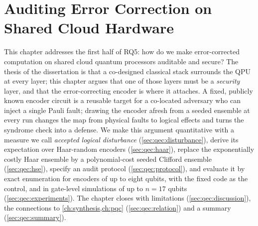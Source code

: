 \chapter{Auditing Error Correction on Shared Cloud Hardware}\label{ch:qec}



This chapter addresses the first half of RQ5: how do we make error-corrected computation on shared cloud quantum processors auditable and secure? The thesis of the dissertation is that a co-designed classical stack surrounds the QPU at every layer; this chapter argues that one of those layers must be a \emph{security} layer, and that the error-correcting encoder is where it attaches. A fixed, publicly known encoder circuit is a reusable target for a co-located adversary who can inject a single Pauli fault; drawing the encoder afresh from a seeded ensemble at every run changes the map from physical faults to logical effects and turns the syndrome check into a defense. We make this argument quantitative with a measure we call \emph{accepted logical disturbance} (\cref{sec:qec:disturbance}), derive its expectation over Haar-random encoders (\cref{sec:qec:haar}), replace the exponentially costly Haar ensemble by a polynomial-cost seeded Clifford ensemble (\cref{sec:qec:hse}), specify an audit protocol (\cref{sec:qec:protocol}), and evaluate it by exact enumeration for encoders of up to eight qubits, with the fixed  code as the control, and in gate-level simulations of up to $n=17$ qubits (\cref{sec:qec:experiments}). The chapter closes with limitations (\cref{sec:qec:discussion}), the connections to \cref{ch:synthesis,ch:pqc} (\cref{sec:qec:relation}) and a summary (\cref{sec:qec:summary}).

